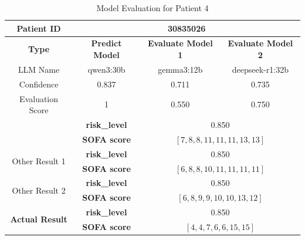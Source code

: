 \begin{table}[htbp]
 \centering
 \caption{Model Evaluation for Patient 4}
 \label{tab:patient4}
 \begin{tabular}{cccc}
 \toprule
 \textbf{ Patient ID } & \multicolumn{3}{c}{30835026} \\
 \midrule
 \textbf{ Type } & \textbf{ Predict Model } & \textbf{ Evaluate Model 1 } & \textbf{ Evaluate Model 2 } \\
 LLM Name & qwen3:30b & gemma3:12b & deepseek-r1:32b \\
 Confidence & 0.837 & 0.711 & 0.735 \\
 Evaluation Score & 1 & 0.550 & 0.750 \\
 \midrule
 \addlinespace
 \multirow{2}{*}{\textbf{ Best Result }} & \textbf{ risk\_level } & \multicolumn{2}{c}{0.850} \\
      & \textbf{ SOFA score } & \multicolumn{2}{c}{$[7, 8, 8, 11, 11, 11, 13, 13]$} \\
 \midrule
 \multirow{2}{*}{Other Result 1} & \textbf{ risk\_level } & \multicolumn{2}{c}{0.850} \\
      & \textbf{ SOFA score } & \multicolumn{2}{c}{$[6, 8, 8, 10, 11, 11, 11, 11]$} \\
 \midrule
 \multirow{2}{*}{Other Result 2} & \textbf{ risk\_level } & \multicolumn{2}{c}{0.850} \\
      & \textbf{ SOFA score } & \multicolumn{2}{c}{$[6, 8, 9, 9, 10, 10, 13, 12]$} \\
 \midrule
 \multirow{2}{*}{\textbf{ Actual Result }} & \textbf{ risk\_level } & \multicolumn{2}{c}{0.850} \\
      & \textbf{ SOFA score } & \multicolumn{2}{c}{$[4, 4, 7, 6, 6, 15, 15]$} \\
 \bottomrule
 \end{tabular}
\end{table}

